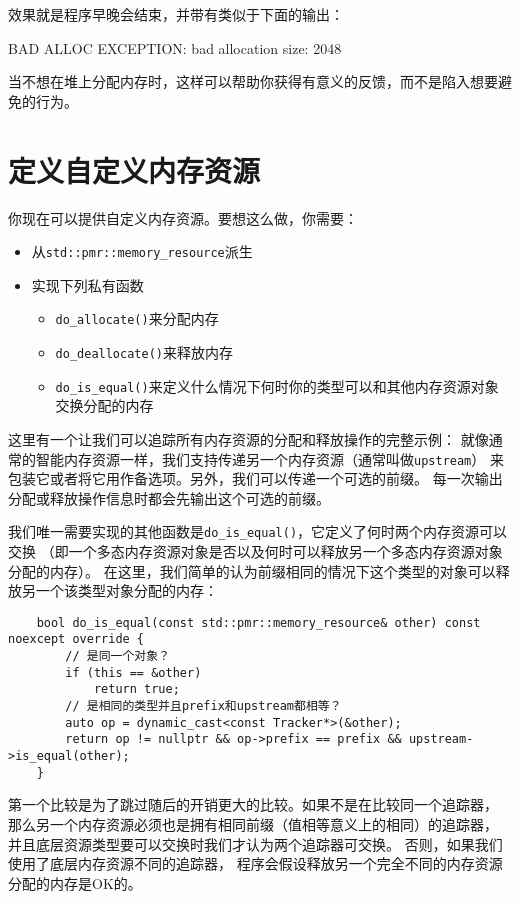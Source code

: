效果就是程序早晚会结束，并带有类似于下面的输出：
\begin{blacklisting}
    BAD ALLOC EXCEPTION: bad allocation
    size: 2048
\end{blacklisting}
当不想在堆上分配内存时，这样可以帮助你获得有意义的反馈，而不是陷入想要避免的行为。


\section{定义自定义内存资源}\label{ch29.2}
你现在可以提供自定义内存资源。要想这么做，你需要：
\begin{itemize}
    \item 从\texttt{std::pmr::memory\_resource}派生
    \item 实现下列私有函数
    \begin{itemize}
        \item \texttt{do\_allocate()}来分配内存
        \item \texttt{do\_deallocate()}来释放内存
        \item \texttt{do\_is\_equal()}来定义什么情况下何时你的类型可以和其他内存资源对象交换分配的内存
    \end{itemize}
\end{itemize}
这里有一个让我们可以追踪所有内存资源的分配和释放操作的完整示例：
就像通常的智能内存资源一样，我们支持传递另一个内存资源（通常叫做\texttt{upstream}）
来包装它或者将它用作备选项。另外，我们可以传递一个可选的前缀。
每一次输出分配或释放操作信息时都会先输出这个可选的前缀。

我们唯一需要实现的其他函数是\texttt{do\_is\_equal()}，它定义了何时两个内存资源可以交换
（即一个多态内存资源对象是否以及何时可以释放另一个多态内存资源对象分配的内存）。
在这里，我们简单的认为前缀相同的情况下这个类型的对象可以释放另一个该类型对象分配的内存：
\begin{lstlisting}
    bool do_is_equal(const std::pmr::memory_resource& other) const noexcept override {
        // 是同一个对象？
        if (this == &other)
            return true;
        // 是相同的类型并且prefix和upstream都相等？
        auto op = dynamic_cast<const Tracker*>(&other);
        return op != nullptr && op->prefix == prefix && upstream->is_equal(other);
    }
\end{lstlisting}
第一个比较是为了跳过随后的开销更大的比较。如果不是在比较同一个追踪器，
那么另一个内存资源必须也是拥有相同前缀（值相等意义上的相同）的追踪器，
并且底层资源类型要可以交换时我们才认为两个追踪器可交换。
否则，如果我们使用了底层内存资源不同的追踪器，
程序会假设释放另一个完全不同的内存资源分配的内存是OK的。

